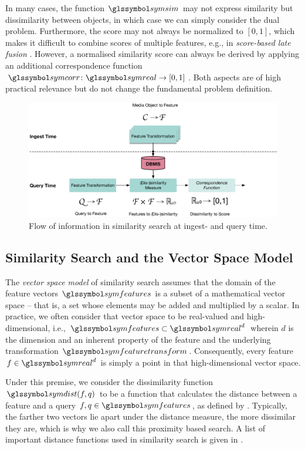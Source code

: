 In many cases, the function $\symsim$ may not express similarity but dissimilarity between objects, in which case we can simply consider the dual problem. Furthermore, the score may not always be normalized to $[0, 1]$, which makes it difficult to combine scores of multiple features, e.g., in \emph{score-based late fusion} \cite{Depeursinge:2010Fusion,Rossetto:2018thesis}. However, a normalised similarity score can always be derived by applying an additional correspondence function $\symcorr \colon \symreal \rightarrow [0, 1]$. Both aspects are of high practical relevance but do not change the fundamental problem definition. 

\begin{figure}[tb]
    \centering
    \includegraphics[width=\textwidth]{figures/multimedia-retrieval-pipeline}
    \caption{Flow of information in similarity search at ingest- and query time.}
    \label{figure:multimedia_retrieval_flow}
\end{figure}

\subsection{Similarity Search and the Vector Space Model}

The \emph{vector space model} of similarity search assumes that the domain of the feature vectors $\symfeatures$ is a subset of a mathematical vector space -- that is, a set whose elements may be added and multiplied by a scalar. In practice, we often consider that vector space to be real-valued and high-dimensional, i.e., $\symfeatures \subset \symreal^{d}$ wherein $d$ is the dimension and an inherent property of the feature and the underlying transformation $\symfeaturetransform$. Consequently, every feature $f \in \symreal^{d}$ is simply a point in that high-dimensional vector space.

Under this premise, we consider the dissimilarity function $\symdist(f,q)$ to be a function that calculates the distance between a feature and a query $f,q \in \symfeatures$, as defined by . Typically, the farther two vectors lie apart under the distance measure, the more dissimilar they are, which is why we also call this proximity based search. A list of important distance functions used in similarity search is given in . 


